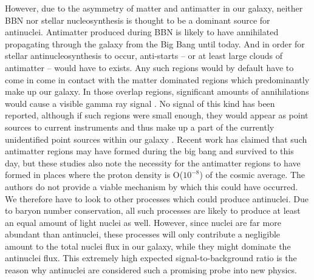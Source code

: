 However, due to the asymmetry of matter and antimatter in our galaxy, neither BBN nor stellar nucleosynthesis is thought to be a dominant source for antinuclei. Antimatter produced during BBN is likely to have annihilated propagating through the galaxy from the Big Bang until today. And in order for stellar antinucleosynthesis to occur, anti-starts -- or at least large clouds of antimatter -- would have to exists. Any such regions would by default have to come in come in contact with the matter dominated regions which predominantly make up our galaxy. In those overlap regions, significant amounts of annihilations would cause a visible gamma ray signal \cite{}.  No signal of this kind has been reported, although if such regions were small enough, they would appear as point sources to current instruments and thus make up a part of the currently unidentified point sources within our galaxy \cite{Fermi Lat point source catalogue}. Recent work has claimed that such antimatter regions may have formed during the big bang and survived to this day\cite{}, but these studies also note the necessity for the antimatter regions to have formed in places where the proton density is O($10^{-8}$) of the cosmic average. The authors do not provide a viable mechanism by which this could have occurred. \\
We therefore have to look to other processes which could produce antinuclei. Due to baryon number conservation, all such processes are likely to produce at least an equal amount of light nuclei as well. However, since nuclei are far more abundant than antinuclei, these processes will only contribute a negligible amount to the total nuclei flux in our galaxy, while they might dominate the antinuclei flux. This extremely high expected signal-to-background ratio is the reason why antinuclei are considered such a promising probe into new physics.


